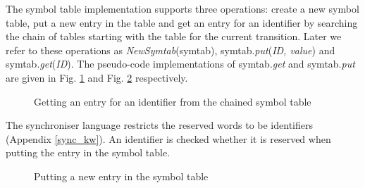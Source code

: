 The symbol table implementation supports three operations: create a new symbol table, put a new entry in the table and get an entry for an identifier by searching the chain of tables starting with the table for the current transition. Later we refer to these operations as \emph{NewSymtab}(symtab), symtab.\emph{put}(\emph{ID, value}) and symtab.\emph{get}(\emph{ID}). The pseudo-code implementations of symtab.\emph{get} and symtab.\emph{put} are given in Fig. \ref{symtab_get} and Fig. \ref{symtab_put} respectively.

\begin{figure}[h!]
\noindent{}
\caption{Getting an entry for an identifier from the chained symbol table\label{symtab_get}}
\end{figure}

The synchroniser language restricts the reserved words to be identifiers (Appendix \ref{sync_kw}). An identifier is checked whether it is reserved when putting the entry in the symbol table.

\begin{figure}[h!]
\noindent{}
\caption{Putting a new entry in the symbol table\label{symtab_put}}
\end{figure}




